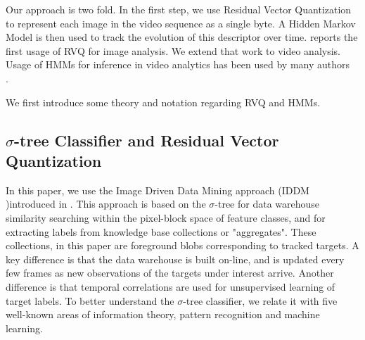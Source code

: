 \documentclass{article}
\begin{document}
Our approach is two fold.  In the first step, we use Residual Vector Quantization to represent each image in the video sequence as a single byte.  A Hidden Markov Model is then used to track the evolution of this descriptor over time.  \cite{2007_JNL_IDDM_Barnes} reports the first usage of RVQ for image analysis.  We extend that work to video analysis.  Usage of HMMs for inference in video analytics has been used by many authors~\cite{2007_CNF_HMMdynamicVideo_Hervieu}
\cite{2004_JNL_SoccerHMM_Sun}.

We first introduce some theory and notation regarding RVQ and HMMs. 
\subsection{$\sigma$-tree Classifier and Residual Vector Quantization}
In this paper, we use the Image Driven Data Mining approach (IDDM )introduced in \cite{2007_JNL_IDDM_Barnes}.  This approach is based on the $\sigma$-tree for data warehouse similarity searching within the pixel-block space of feature classes, and for extracting labels from knowledge base collections or "aggregates".  These collections, in this paper are foreground blobs corresponding to tracked targets.  A key difference is that the data warehouse is built on-line, and is updated every few frames as new observations of the targets under interest arrive.  Another difference is that temporal correlations are used for unsupervised learning of target labels.  To better understand the $\sigma$-tree classifier, we relate it with five well-known areas of information theory, pattern recognition and machine learning.  
\end{document}
